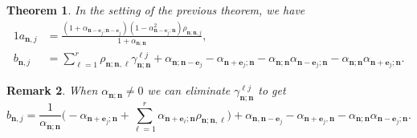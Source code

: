 \documentclass[reqno,centertags,11pt,draft]{amsart}
\newtheorem{thm}{Theorem}[section]
\newtheorem{rem}[thm]{Remark}
\begin{document}
\begin{thm}\label{thm:Geronimus}
    In the setting of the previous theorem, we have
    \begin{alignat}{1}
    \label{eq:Geronimus1}
        a_{\bm{n},j} & =
        \frac{(1+\alpha_{\bm{n}-\bm{e}_j;\bm{n}-\bm{e}_j})(1-\alpha_{\bm{n}-\bm{e}_j;\bm{n}}^2
        )\rho_{\bm{n};\bm{n},j} 
        }{1+\alpha_{\bm{n};\bm{n}}},
        \\
        \label{eq:Geronimus2}
        b_{\bm{n},j} & =
        \sum_{\ell=1}^r \rho_{\bm{n};\bm{n},\ell}  \gamma_{\bm{n};\bm{n}}^{\ell j}+
        \alpha_{\bm{n};\bm{n}-\bm{e}_j} - \alpha_{\bm{n}+\bm{e}_j;\bm{n}}
        - \alpha_{\bm{n};\bm{n}} \alpha_{\bm{n}-\bm{e}_j;\bm{n}}
        - \alpha_{\bm{n};\bm{n}} \alpha_{\bm{n}+\bm{e}_j;\bm{n}} .
    \end{alignat}
\end{thm}
\begin{rem}
    When $\alpha_{\bm{n};\bm{n}} \neq 0$ we can eliminate $\gamma_{\bm{n};\bm{n}}^{\ell j}$ to get
    \begin{equation}
        \label{eq:Geronimus2.1}
        b_{\bm{n},j}  =
        \frac{1}{\alpha_{\bm{n};\bm{n}}}\bigg(-\alpha_{\bm{n}+\bm{e}_j;\bm{n}}+\sum_{\ell=1}^r \alpha_{\bm{n}+\bm{e}_{\ell};\bm{n}}\rho_{\bm{n};\bm{n},\ell}\bigg)  +
        \alpha_{\bm{n},\bm{n}-\bm{e}_j} - \alpha_{\bm{n}+\bm{e}_j,\bm{n}}
        - \alpha_{\bm{n};\bm{n}} \alpha_{\bm{n}-\bm{e}_j;\bm{n}} .
    \end{equation}
\end{rem}
\end{document}

